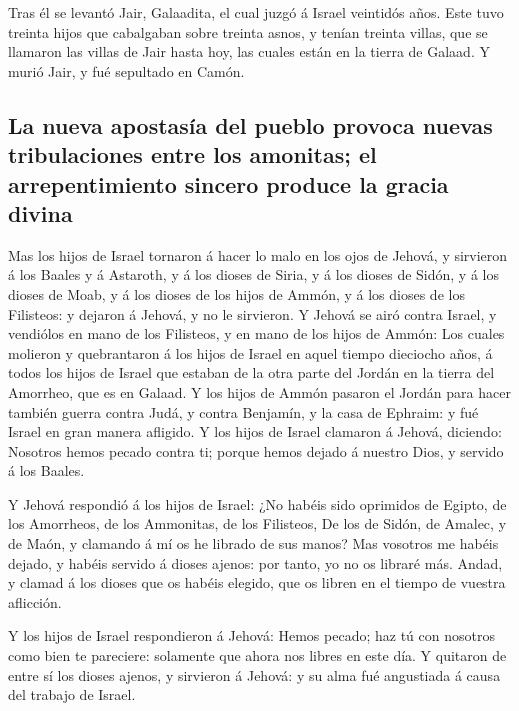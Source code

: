  Tras él se levantó Jair, Galaadita, el cual juzgó á Israel
veintidós años.  Este tuvo treinta hijos que cabalgaban
sobre treinta asnos, y tenían treinta villas, que se llamaron las villas
de Jair hasta hoy, las cuales están en la tierra de Galaad. 
Y murió Jair, y fué sepultado en Camón.

\hypertarget{la-nueva-apostasuxeda-del-pueblo-provoca-nuevas-tribulaciones-entre-los-amonitas-el-arrepentimiento-sincero-produce-la-gracia-divina}{%
\subsection{La nueva apostasía del pueblo provoca nuevas tribulaciones
entre los amonitas; el arrepentimiento sincero produce la gracia
divina}\label{la-nueva-apostasuxeda-del-pueblo-provoca-nuevas-tribulaciones-entre-los-amonitas-el-arrepentimiento-sincero-produce-la-gracia-divina}}

 Mas los hijos de Israel tornaron á hacer lo malo en los
ojos de Jehová, y sirvieron á los Baales y á Astaroth, y á los dioses de
Siria, y á los dioses de Sidón, y á los dioses de Moab, y á los dioses
de los hijos de Ammón, y á los dioses de los Filisteos: y dejaron á
Jehová, y no le sirvieron.  Y Jehová se airó contra Israel,
y vendiólos en mano de los Filisteos, y en mano de los hijos de Ammón:
 Los cuales molieron y quebrantaron á los hijos de Israel en
aquel tiempo dieciocho años, á todos los hijos de Israel que estaban de
la otra parte del Jordán en la tierra del Amorrheo, que es en Galaad.
 Y los hijos de Ammón pasaron el Jordán para hacer también
guerra contra Judá, y contra Benjamín, y la casa de Ephraim: y fué
Israel en gran manera afligido.  Y los hijos de Israel
clamaron á Jehová, diciendo: Nosotros hemos pecado contra ti; porque
hemos dejado á nuestro Dios, y servido á los Baales.

 Y Jehová respondió á los hijos de Israel: ¿No habéis sido
oprimidos de Egipto, de los Amorrheos, de los Ammonitas, de los
Filisteos,  De los de Sidón, de Amalec, y de Maón, y
clamando á mí os he librado de sus manos?  Mas vosotros me
habéis dejado, y habéis servido á dioses ajenos: por tanto, yo no os
libraré más.  Andad, y clamad á los dioses que os habéis
elegido, que os libren en el tiempo de vuestra aflicción.

 Y los hijos de Israel respondieron á Jehová: Hemos pecado;
haz tú con nosotros como bien te pareciere: solamente que ahora nos
libres en este día.  Y quitaron de entre sí los dioses
ajenos, y sirvieron á Jehová: y su alma fué angustiada á causa del
trabajo de Israel.

